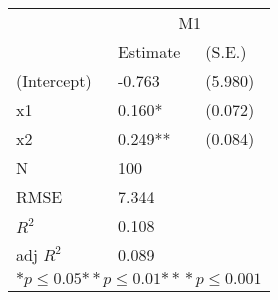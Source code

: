 \begin{tabular}{*{3}{l}}
\hline
                  & \multicolumn{2}{c}{M1}   \tabularnewline
                   &Estimate  &(S.E.)  \tabularnewline
 \hline
 \hline
   (Intercept)     &-0.763   &   (5.980) \tabularnewline
   x1              &0.160*   &   (0.072) \tabularnewline
   x2              &0.249**   &   (0.084) \tabularnewline
 \hline
 N                 &100       &        \tabularnewline
 RMSE             &7.344         & \tabularnewline
 $R^2$             &0.108         & \tabularnewline
 adj $R^2$         &0.089         & \tabularnewline
 \hline
\hline
 
 \multicolumn{3}{c}{${*  p}\le 0.05$${*\!\!*  p}\le 0.01$${*\!\!*\!\!*  p}\le 0.001$}\tabularnewline
 \end{tabular}